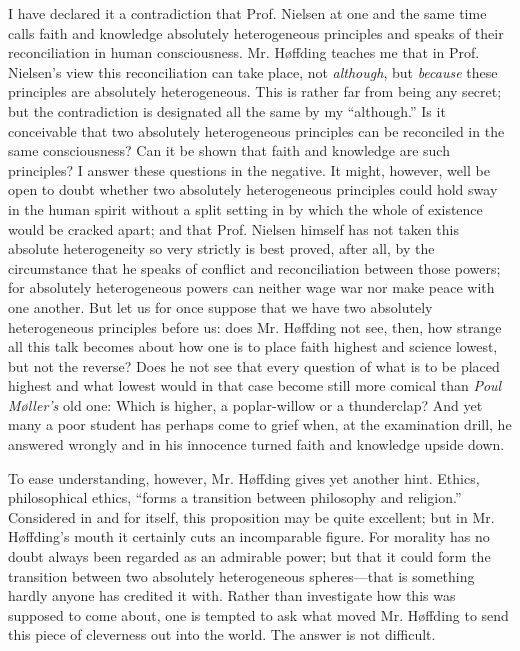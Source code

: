 \documentclass[12pt,a4paper,openany]{book}
\newcommand{\opage}[1]{\marginnote{\footnotesize\textit{[#1]}}}
\begin{document}
I have declared it a contradiction that Prof. Nielsen
at one and the same time calls faith and knowledge absolutely heterogeneous principles
\opage{14}and speaks of their reconciliation in human
consciousness. Mr. Høffding teaches me that in Prof. Nielsen's view
this reconciliation can take place, not \emph{although}, but \emph{because}
these principles are absolutely heterogeneous. This is rather far from
being any secret; but the contradiction is designated all the same by
my ``although.'' Is it conceivable that two absolutely heterogeneous
principles can be reconciled in the same consciousness? Can it be
shown that faith and knowledge are such principles? I answer these
questions in the negative. It might, however, well be open to doubt
whether two absolutely heterogeneous principles could hold sway in the
human spirit without a split setting in by which the whole of existence
would be cracked apart; and that Prof. Nielsen himself has not taken
this absolute heterogeneity so very strictly is best proved, after all,
by the circumstance that he speaks of conflict and reconciliation between
those powers; for absolutely heterogeneous powers can neither wage
war nor make peace with one another. But let us for once
suppose that we have two absolutely heterogeneous principles before us:
does Mr. Høffding not see, then, how strange all this talk becomes
about how one is to place faith highest and science lowest,
but not the reverse? Does he not see that every question of
what is to be placed highest and what lowest would in that case become
still more comical than \emph{Poul Møller's} old one: Which is higher, a
poplar-willow or a thunderclap? And yet many a poor student has perhaps
come to grief when, at the examination drill, he answered
wrongly and in his innocence turned faith and
knowledge upside down.

To ease understanding, however, Mr. Høffding gives
yet another hint. Ethics, philosophical ethics, ``forms a transition
between philosophy and religion.'' Considered in and for itself,
this proposition may be quite excellent; but in Mr. Høffding's
mouth it certainly cuts an incomparable figure. For morality has no doubt
always been regarded as an admirable power; but that it could form
the transition between two absolutely heterogeneous spheres---that
is something hardly anyone has credited it with. Rather than
investigate how this was supposed to come about, one is tempted to
ask what moved Mr. Høffding to send this piece of cleverness out into
the world. The answer is not difficult.
\end{document}
